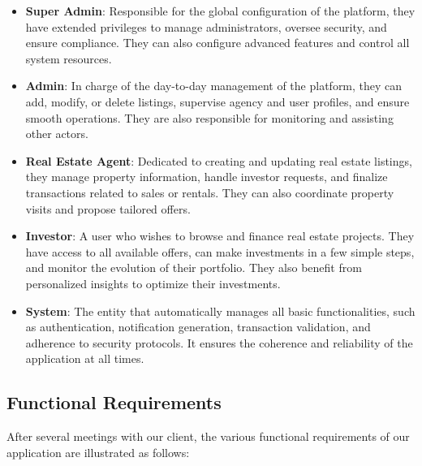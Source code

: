 \begin{itemize}
    \item \textbf{\textcolor{primary}{Super Admin}}: Responsible for the global configuration of the platform, they have extended privileges to manage administrators, oversee security, and ensure compliance. They can also configure advanced features and control all system resources.
    
    \item \textbf{\textcolor{primary}{Admin}}: In charge of the day-to-day management of the platform, they can add, modify, or delete listings, supervise agency and user profiles, and ensure smooth operations. They are also responsible for monitoring and assisting other actors.
    
    \item \textbf{\textcolor{primary}{Real Estate Agent}}: Dedicated to creating and updating real estate listings, they manage property information, handle investor requests, and finalize transactions related to sales or rentals. They can also coordinate property visits and propose tailored offers.
    
    \item \textbf{\textcolor{primary}{Investor}}: A user who wishes to browse and finance real estate projects. They have access to all available offers, can make investments in a few simple steps, and monitor the evolution of their portfolio. They also benefit from personalized insights to optimize their investments.
    
    \item \textbf{\textcolor{primary}{System}}: The entity that automatically manages all basic functionalities, such as authentication, notification generation, transaction validation, and adherence to security protocols. It ensures the coherence and reliability of the application at all times.
\end{itemize} 

\subsection{Functional Requirements}

After several meetings with our client, the various functional requirements of our application are illustrated as follows:

